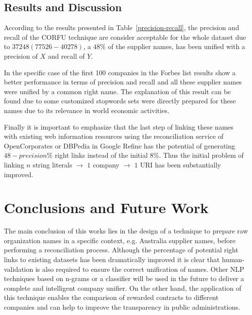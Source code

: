 \documentclass{llncs}
\begin{document}
\subsection{Results and Discussion}
According to the results presented in Table~\ref{precision-recall}, the precision 
and recall of the CORFU technique are consider acceptable for the whole dataset 
due to $37248 (77526-40278)$, a $48\%$ of the supplier names, has been unified with 
a precision of $X$ and recall of $Y$.

In the specific case of the first 100 companies in the Forbes list results show a better 
performance in terms of precision and recall and all these supplier names 
were unified by a common right name. The explanation of this result 
can be found due to some customized stopwords sets were directly prepared for 
these names due to its relevance in world economic activities.

Finally it is important to emphasize that the last step of linking these names 
with existing web information resources using the reconciliation service of 
OpenCorporates or DBPedia in Google Refine has the potential of generating $48-precision$\% right 
links instead of the initial $8$\%. Thus the initial problem of linking $n$ string literals $\to$ 
$1$ company $\to$ $1$ URI has been substantially improved. 





\section{Conclusions and Future Work}
The main conclusion of this works lies in the design of a technique to prepare 
raw organization names in a specific context, e.g. Australia supplier names,  
before performing a reconciliation process. Although the percentage of potential 
right links to existing datasets has been dramatically improved it is clear that 
human-validation is also required to ensure the correct unification of names. 
Other NLP techniques based on n-grams or a classifier will be used in the future 
to deliver a complete and intelligent company unifier. On the other hand, the 
application of this technique enables the comparison of rewarded contracts to 
different companies and can help to improve the transparency in public 
administrations.



\end{document}
